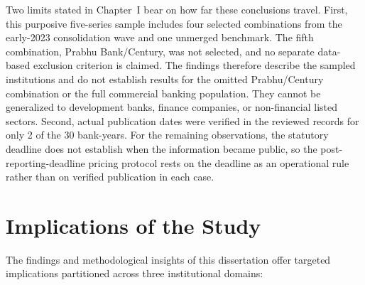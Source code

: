Two limits stated in Chapter~I bear on how far these conclusions travel. First, this purposive five-series sample includes four selected combinations from the early-2023 consolidation wave and one unmerged benchmark. The fifth combination, Prabhu Bank/Century, was not selected, and no separate data-based exclusion criterion is claimed. The findings therefore describe the sampled institutions and do not establish results for the omitted Prabhu/Century combination or the full commercial banking population. They cannot be generalized to development banks, finance companies, or non-financial listed sectors. Second, actual publication dates were verified in the reviewed records for only 2 of the 30 bank-years. For the remaining observations, the statutory deadline does not establish when the information became public, so the post-reporting-deadline pricing protocol rests on the deadline as an operational rule rather than on verified publication in each case.

\section{Implications of the Study}

The findings and methodological insights of this dissertation offer targeted implications partitioned across three institutional domains:

